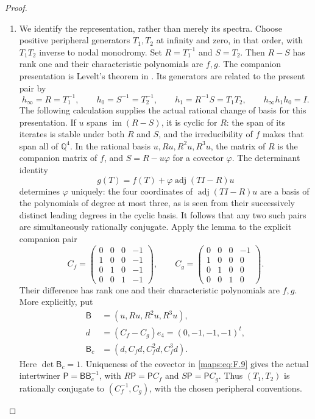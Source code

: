 \begin{proof}
\begin{enumerate}[label=\arabic*.]
\item We identify the representation, rather than merely its spectra.
Choose positive peripheral generators $T_1,T_2$ at infinity and
zero, in that order, with $T_1T_2$ inverse to nodal monodromy.
Set $R=T_1^{-1}$ and $S=T_2$.  Then $R-S$ has rank one and their
characteristic polynomials are $f,g$.  The companion presentation
is Levelt's theorem in \cite[Theorem 3.5, pp.~331--332;
Corollary 3.6, p.~332]{BeukersHeckman1989}.  Its generators are
related to the present pair by
\[
 h_\infty=R=T_1^{-1},\qquad h_0=S^{-1}=T_2^{-1},\qquad
 h_1=R^{-1}S=T_1T_2,\qquad h_\infty h_1h_0=I.
\]
The following calculation supplies the actual rational change
of basis for this presentation.
If $u$ spans $\operatorname{im}(R-S)$, it is cyclic for $R$:
the span of its iterates is stable under both $R$ and $S$, and
the irreducibility of $f$ makes that span all of $\mathbb Q^4$.
In the rational basis $u,Ru,R^2u,R^3u$, the matrix of $R$ is
the companion matrix of $f$, and $S=R-u\varphi$ for a covector
$\varphi$.  The determinant identity
\[
 g(T)=f(T)+\varphi\operatorname{adj}(TI-R)u
 \tag{F.9}\label{maps:eq:F.9}
\]
determines $\varphi$ uniquely: the four coordinates of
$\operatorname{adj}(TI-R)u$ are a basis of the polynomials of
degree at most three, as is seen from their successively distinct
leading degrees in the cyclic basis.  It follows that any two
such pairs are simultaneously rationally conjugate.  Apply the
lemma to the explicit companion pair
\[
 C_f=\begin{pmatrix}
 0&0&0&-1\\1&0&0&-1\\0&1&0&-1\\0&0&1&-1
 \end{pmatrix},\qquad
 C_g=\begin{pmatrix}
 0&0&0&-1\\1&0&0&0\\0&1&0&0\\0&0&1&0
 \end{pmatrix}.
 \tag{F.10}\label{maps:eq:F.10}
\]
Their difference has rank one and their characteristic polynomials
are $f,g$.  More explicitly, put
\[
 \begin{aligned}
 \mathsf B&=(u,Ru,R^2u,R^3u),\\
 d&=(C_f-C_g)e_4=(0,-1,-1,-1)^t,\\
 \mathsf B_c&=(d,C_fd,C_f^2d,C_f^3d).
 \end{aligned}
\]
Here $\det\mathsf B_c=1$.  Uniqueness of the covector in
\eqref{maps:eq:F.9} gives the actual intertwiner
$\mathsf P=\mathsf B\mathsf B_c^{-1}$, with
$R\mathsf P=\mathsf P C_f$ and $S\mathsf P=\mathsf P C_g$.
Thus $(T_1,T_2)$ is rationally conjugate to
$(C_f^{-1},C_g)$, with the chosen peripheral conventions.


\end{enumerate}
\end{proof}

